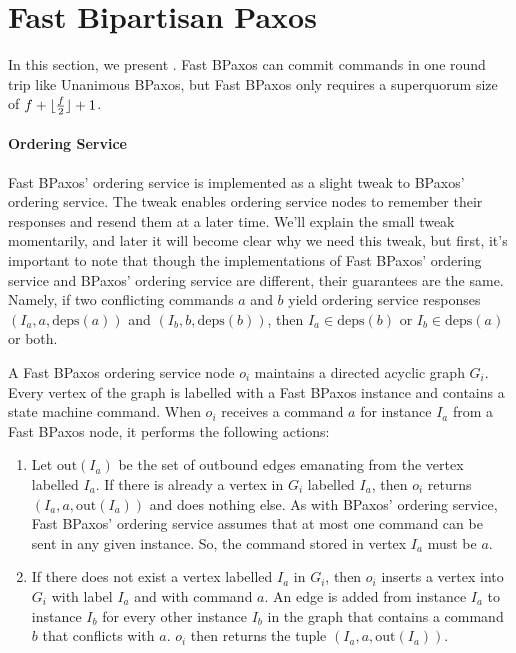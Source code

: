 \documentclass{mwhittaker}
\theoremstyle{definition}
\newcommand{\deps}[1]{\text{deps}(#1)}
\begin{document}
\section{Fast Bipartisan Paxos}
In this section, we present . Fast BPaxos can
commit commands in one round trip like Unanimous BPaxos, but Fast BPaxos only
requires a superquorum size of $f + \lfloor\frac{f}{2}\rfloor + 1$.

\paragraph{Ordering Service}
Fast BPaxos' ordering service is implemented as a slight tweak to BPaxos'
ordering service. The tweak enables ordering service nodes to remember their
responses and resend them at a later time. We'll explain the small tweak
momentarily, and later it will become clear why we need this tweak, but first,
it's important to note that though the implementations of Fast BPaxos' ordering
service and BPaxos' ordering service are different, their guarantees are the
same. Namely, if two conflicting commands $a$ and $b$ yield ordering service
responses $(I_a, a, \deps{a})$ and $(I_b, b, \deps{b})$, then $I_a \in
\deps{b}$ or $I_b \in \deps{a}$ or both.

\newcommand{\out}{\text{out}}
A Fast BPaxos ordering service node $o_i$ maintains a directed acyclic graph
$G_i$. Every vertex of the graph is labelled with a Fast BPaxos instance and
contains a state machine command. When $o_i$ receives a command $a$ for
instance $I_a$ from a Fast BPaxos node, it performs the following actions:
\begin{enumerate}
  \item
    Let $\out(I_a)$ be the set of outbound edges emanating from the vertex
    labelled $I_a$. If there is already a vertex in $G_i$ labelled $I_a$,
    then $o_i$ returns $(I_a, a, \out(I_a))$ and does nothing else. As with
    BPaxos' ordering service, Fast BPaxos' ordering service assumes that at
    most one command can be sent in any given instance. So, the command stored
    in vertex $I_a$ must be $a$.
  \item
    If there does not exist a vertex labelled $I_a$ in $G_i$, then $o_i$
    inserts a vertex into $G_i$ with label $I_a$ and with command $a$. An edge
    is added from instance $I_a$ to instance $I_b$ for every other instance
    $I_b$ in the graph that contains a command $b$ that conflicts with $a$.
    $o_i$ then returns the tuple $(I_a, a, \out(I_a))$.
\end{enumerate}
\end{document}
